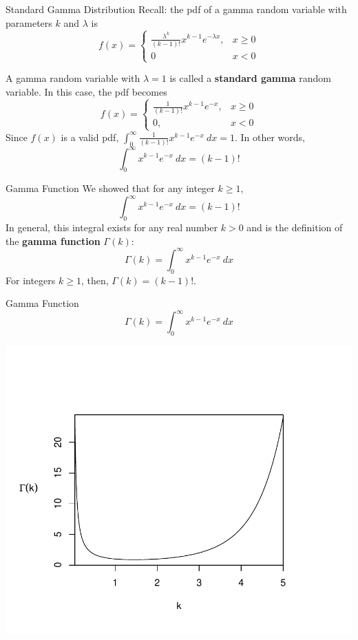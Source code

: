 \documentclass{beamer}
\renewcommand{\emph}{\textbf}
\begin{document}
\begin{frame}{Standard Gamma Distribution}
Recall: the pdf of a gamma random variable with parameters $k$ and $\lambda$ is
$$f(x) =\begin{cases} \frac{\lambda^k}{(k-1)!}x^{k-1}e^{-\lambda x}, & x\geq 0 \\ 0 & x<0\end{cases}$$

\pause A gamma random variable with $\lambda=1$ is called a \emph{standard gamma} random variable. In this case, the pdf becomes
$$f(x) = \begin{cases}\frac1{(k-1)!}x^{k-1}e^{-x}, & x\geq 0 \\ 0, & x<0\end{cases}$$
\pause Since $f(x)$ is a valid pdf, $\int_0^\infty \frac1{(k-1)!}x^{k-1}e^{-x}\ dx = 1$. In other words,
$$\int_0^\infty x^{k-1}e^{-x}\ dx=(k-1)!$$
\end{frame}

\begin{frame}{Gamma Function}
We showed that for any integer $k\geq 1$, 
$$\int_0^\infty x^{k-1}e^{-x}\ dx=(k-1)!$$
\pause In general, this integral exists for any real number $k>0$ and is the definition of the \emph{gamma function} $\Gamma(k)$:
$$\Gamma(k) = \int_0^\infty x^{k-1}e^{-x}\ dx$$
\pause For integers $k\geq 1$, then, $\Gamma(k)=(k-1)!$.
\end{frame}

\begin{frame}{Gamma Function}
$$\Gamma(k) = \int_0^\infty x^{k-1}e^{-x}\ dx$$
\begin{center}
\vspace{-1.5cm}
\includegraphics[scale=.7]{ch4_gamfun.pdf}
\end{center}
\end{frame}
\end{document}
